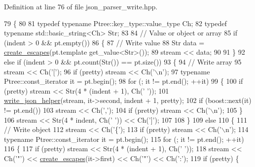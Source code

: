 Definition at line 76 of file json\-\_\-parser\-\_\-write.\-hpp.


\begin{DoxyCode}
79 \{
80 
81   \textcolor{keyword}{typedef} \textcolor{keyword}{typename} Ptree::key\_type::value\_type Ch;
82   \textcolor{keyword}{typedef} \textcolor{keyword}{typename} std::basic\_string<Ch> Str;
83 
84   \textcolor{comment}{// Value or object or array}
85   \textcolor{keywordflow}{if} (indent > 0 && pt.empty())
86   \{
87     \textcolor{comment}{// Write value}
88     Str data = \hyperlink{namespaceboost_1_1property__tree_1_1json__parser_a747e92e137769eb6b27edb76d613f37a}{create\_escapes}(pt.template get\_value<Str>());
89     stream << data;
90 
91   \}
92   \textcolor{keywordflow}{else} \textcolor{keywordflow}{if} (indent > 0 && pt.count(Str()) == pt.size())
93   \{
94     \textcolor{comment}{// Write array}
95     stream << Ch(\textcolor{charliteral}{'['});
96     \textcolor{keywordflow}{if} (pretty) stream << Ch(\textcolor{charliteral}{'\(\backslash\)n'});
97     \textcolor{keyword}{typename} Ptree::const\_iterator it = pt.begin();
98     \textcolor{keywordflow}{for} (; it != pt.end(); ++it)
99     \{
100       \textcolor{keywordflow}{if} (pretty) stream << Str(4 * (indent + 1), Ch(\textcolor{charliteral}{' '}));
101       \hyperlink{namespaceboost_1_1property__tree_1_1json__parser_a133973ddea67e6d77424312cd297b332}{write\_json\_helper}(stream, it->second, indent + 1, pretty);
102       \textcolor{keywordflow}{if} (boost::next(it) != pt.end())
103         stream << Ch(\textcolor{charliteral}{','});
104       \textcolor{keywordflow}{if} (pretty) stream << Ch(\textcolor{charliteral}{'\(\backslash\)n'});
105     \}
106     stream << Str(4 * indent, Ch(\textcolor{charliteral}{' '})) << Ch(\textcolor{charliteral}{']'});
107 
108   \}
109   \textcolor{keywordflow}{else}
110   \{
111     \textcolor{comment}{// Write object}
112     stream << Ch(\textcolor{charliteral}{'\{'});
113     \textcolor{keywordflow}{if} (pretty) stream << Ch(\textcolor{charliteral}{'\(\backslash\)n'});
114     \textcolor{keyword}{typename} Ptree::const\_iterator it = pt.begin();
115     \textcolor{keywordflow}{for} (; it != pt.end(); ++it)
116     \{
117       \textcolor{keywordflow}{if} (pretty) stream << Str(4 * (indent + 1), Ch(\textcolor{charliteral}{' '}));
118       stream << Ch(\textcolor{charliteral}{'"'}) << \hyperlink{namespaceboost_1_1property__tree_1_1json__parser_a747e92e137769eb6b27edb76d613f37a}{create\_escapes}(it->first) << Ch(\textcolor{charliteral}{'"'}) << Ch(\textcolor{charliteral}{':'});
119       \textcolor{keywordflow}{if} (pretty) \{

\end{DoxyCode}
